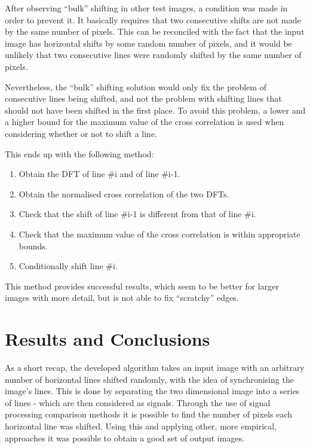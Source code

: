 \documentclass[a4paper,12pt]{article}
\begin{document}
After observing ``bulk'' shifting in other test images, a condition was made in order to prevent it. It basically requires that two consecutive shifts are not made by the same number of pixels. This can be reconciled with the fact that the input image has horizontal shifts by some random number of pixels, and it would be unlikely that two consecutive lines were randomly shifted by the same number of pixels. 

Nevertheless, the ``bulk'' shifting solution would only fix the problem of consecutive lines being shifted, and not the problem with shifting lines that should not have been shifted in the first place. To avoid this problem, a lower and a higher bound for the maximum value of the cross correlation is used when considering whether or not to shift a line. 

This ends up with the following method:

\begin{enumerate}
 \item Obtain the DFT of line \#i and of line \#i-1.
 \item Obtain the normalised cross correlation of the two DFTs.
 \item Check that the shift of line \#i-1 is different from that of line \#i.
 \item Check that the maximum value of the cross correlation is within appropriate bounds.
 \item Conditionally shift line \#i. 
\end{enumerate}

This method provides successful results, which seem to be better for larger images with more detail, but is not able to fix ``scratchy'' edges.

\section{Results and Conclusions}

As a short recap, the developed algorithm takes an input image with an arbitrary number of horizontal lines shifted randomly, with the idea of synchronising the image's lines. This is done by separating the two dimensional image into a series of lines - which are then considered as signals. Through the use of signal processing comparison methods it is possible to find the number of pixels each horizontal line was shifted. Using this and applying other, more empirical, approaches it was possible to obtain a good set of output images. 
\end{document}

